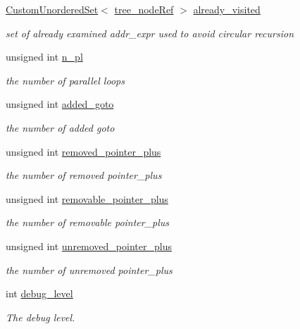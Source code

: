 \begin{DoxyCompactItemize}
\hyperlink{classCustomUnorderedSet}{Custom\+Unordered\+Set}$<$ \hyperlink{tree__node_8hpp_a6ee377554d1c4871ad66a337eaa67fd5}{tree\+\_\+node\+Ref} $>$ \hyperlink{classtree__manager_a9be32a1a1bed7bf705250f21b9539597}{already\+\_\+visited}
\begin{DoxyCompactList}\small\item\em set of already examined addr\+\_\+expr used to avoid circular recursion \end{DoxyCompactList}\item 
unsigned int \hyperlink{classtree__manager_a0db5ffaf1c720d84572a390333cbec5d}{n\+\_\+pl}
\begin{DoxyCompactList}\small\item\em the number of parallel loops \end{DoxyCompactList}\item 
unsigned int \hyperlink{classtree__manager_a6e4b6318437f763fc451a2773b4adf41}{added\+\_\+goto}
\begin{DoxyCompactList}\small\item\em the number of added goto \end{DoxyCompactList}\item 
unsigned int \hyperlink{classtree__manager_a61c78fb4ece86e5178a6034f5c158b47}{removed\+\_\+pointer\+\_\+plus}
\begin{DoxyCompactList}\small\item\em the number of removed pointer\+\_\+plus \end{DoxyCompactList}\item 
unsigned int \hyperlink{classtree__manager_a9a63f1945061e6ce166b2339ae876c2a}{removable\+\_\+pointer\+\_\+plus}
\begin{DoxyCompactList}\small\item\em the number of removable pointer\+\_\+plus \end{DoxyCompactList}\item 
unsigned int \hyperlink{classtree__manager_a8f14de3b8c460cfbe7abe5792eee137f}{unremoved\+\_\+pointer\+\_\+plus}
\begin{DoxyCompactList}\small\item\em the number of unremoved pointer\+\_\+plus \end{DoxyCompactList}\item 
int \hyperlink{classtree__manager_af7704af4a3b503f0277fe1fa9beccd52}{debug\+\_\+level}
\begin{DoxyCompactList}\small\item\em The debug level. \end{DoxyCompactList}\item 

\end{DoxyCompactItemize}

